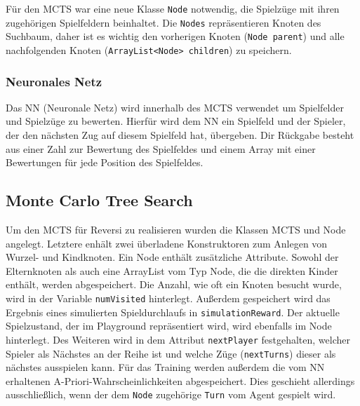 \documentclass[12pt,a4paper]{article}
\begin{document}
Für den MCTS war eine neue Klasse \texttt{Node} notwendig, die Spielzüge mit ihren zugehörigen Spielfeldern beinhaltet. Die \texttt {Nodes} repräsentieren Knoten des Suchbaum, daher ist es wichtig den vorherigen Knoten (\texttt{Node parent}) und alle nachfolgenden Knoten (\texttt{ArrayList<Node> children}) zu speichern.

\subsubsection{Neuronales Netz}
Das NN (Neuronale Netz) wird innerhalb des MCTS verwendet um Spielfelder und Spielzüge zu bewerten. Hierfür wird dem NN ein Spielfeld und der Spieler, der den nächsten Zug auf diesem Spielfeld hat, übergeben. Dir Rückgabe besteht aus einer Zahl zur Bewertung des Spielfeldes und einem Array mit einer Bewertungen für jede Position des Spielfeldes. 


\subsection{Monte Carlo Tree Search}\label{MCTS}
Um den MCTS für Reversi zu realisieren wurden die Klassen MCTS und Node angelegt. Letztere enhält zwei überladene Konstruktoren zum Anlegen von Wurzel- und Kindknoten. Ein Node enthält zusätzliche Attribute. Sowohl der Elternknoten als auch eine ArrayList vom Typ Node, die die direkten Kinder enthält, werden abgespeichert. Die Anzahl, wie oft ein Knoten besucht wurde, wird in der Variable \texttt{numVisited} hinterlegt. Außerdem gespeichert wird das Ergebnis eines simulierten Spieldurchlaufs in \texttt{simulationReward}. Der aktuelle Spielzustand, der im Playground repräsentiert wird, wird ebenfalls im Node hinterlegt. Des Weiteren wird in dem Attribut \texttt{nextPlayer} festgehalten, welcher Spieler als Nächstes an der Reihe ist und welche Züge (\texttt{nextTurns}) dieser als nächstes ausspielen kann. Für das Training werden außerdem die vom NN erhaltenen A-Priori-Wahrscheinlichkeiten abgespeichert. Dies geschieht allerdings ausschließlich, wenn der dem \texttt{Node} zugehörige \texttt{Turn} vom Agent gespielt wird.
\end{document}
